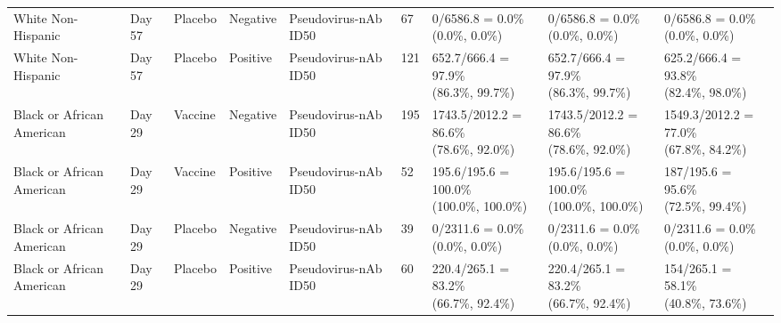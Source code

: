 \documentclass[]{book}
\theoremstyle{definition}
\theoremstyle{definition}
\theoremstyle{definition}
\newcommand{\1}{\mathbbm{1}}
\begin{document}
\begin{landscape}
\begin{ThreePartTable}
\begin{longtable}[t]{>{\raggedright\arraybackslash}p{2.7cm}llllllll}
\hspace{1em}White Non-Hispanic & Day 57 & Placebo & Negative & Pseudovirus-nAb ID50 & 67 & \makecell[l]{0/6586.8 = 0.0\%\\(0.0\%, 0.0\%)} & \makecell[l]{0/6586.8 = 0.0\%\\(0.0\%, 0.0\%)} & \makecell[l]{0/6586.8 = 0.0\%\\(0.0\%, 0.0\%)}\\
\hspace{1em}White Non-Hispanic & Day 57 & Placebo & Positive & Pseudovirus-nAb ID50 & 121 & \makecell[l]{652.7/666.4 = 97.9\%\\(86.3\%, 99.7\%)} & \makecell[l]{652.7/666.4 = 97.9\%\\(86.3\%, 99.7\%)} & \makecell[l]{625.2/666.4 = 93.8\%\\(82.4\%, 98.0\%)}\\
\hspace{1em}Black or African American & Day 29 & Vaccine & Negative & Pseudovirus-nAb ID50 & 195 & \makecell[l]{1743.5/2012.2 = 86.6\%\\(78.6\%, 92.0\%)} & \makecell[l]{1743.5/2012.2 = 86.6\%\\(78.6\%, 92.0\%)} & \makecell[l]{1549.3/2012.2 = 77.0\%\\(67.8\%, 84.2\%)}\\
\hspace{1em}Black or African American & Day 29 & Vaccine & Positive & Pseudovirus-nAb ID50 & 52 & \makecell[l]{195.6/195.6 = 100.0\%\\(100.0\%, 100.0\%)} & \makecell[l]{195.6/195.6 = 100.0\%\\(100.0\%, 100.0\%)} & \makecell[l]{187/195.6 = 95.6\%\\(72.5\%, 99.4\%)}\\
\hspace{1em}Black or African American & Day 29 & Placebo & Negative & Pseudovirus-nAb ID50 & 39 & \makecell[l]{0/2311.6 = 0.0\%\\(0.0\%, 0.0\%)} & \makecell[l]{0/2311.6 = 0.0\%\\(0.0\%, 0.0\%)} & \makecell[l]{0/2311.6 = 0.0\%\\(0.0\%, 0.0\%)}\\
\hspace{1em}Black or African American & Day 29 & Placebo & Positive & Pseudovirus-nAb ID50 & 60 & \makecell[l]{220.4/265.1 = 83.2\%\\(66.7\%, 92.4\%)} & \makecell[l]{220.4/265.1 = 83.2\%\\(66.7\%, 92.4\%)} & \makecell[l]{154/265.1 = 58.1\%\\(40.8\%, 73.6\%)}\\

\end{longtable}
\end{ThreePartTable}
\end{landscape}
\end{document}
